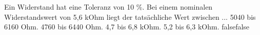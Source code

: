     {Ein Widerstand hat eine Toleranz von 10 \%. Bei einem nominalen Widerstandswert von 5,6 kOhm liegt der tatsächliche Wert zwischen ...}
    {5040 bis 6160 Ohm.}
    {4760 bis 6440 Ohm.}
    {4,7 bis 6,8 kOhm.}
    {5,2 bis 6,3 kOhm.}
    {false}{false}